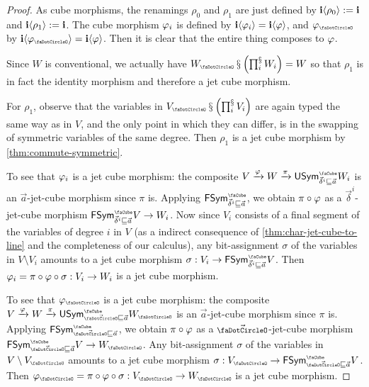\documentclass[a4paper]{memoir}
\begin{document}
\begin{proof}
	As cube morphisms, the renamings $\rho_0$ and $\rho_1$ are just defined by $\mathbf{i} \langle \rho_0 \rangle := \mathbf{i}$ and $\mathbf{i} \langle \rho_1 \rangle := \mathbf{i}$.
	The cube morphism $\varphi_i$ is defined by $\mathbf{i} \langle \varphi_i \rangle = \mathbf{i} \langle \varphi \rangle$, and $\vfi_\npolar$ by $\dm i \psub{\vfi_\npolar} = \dm i \psub{\vfi}$.
	Then it is clear that the entire thing composes to $\varphi$.
	
	Since $W$ is conventional, we actually have $W_\npolar \sss \paren{\bigsss_i W_i} = W$ so that $\rho_1$ is in fact the identity morphism and therefore a jet cube morphism.
	
	For $\rho_1$, observe that the variables in $V_\npolar \sss \paren{\bigsss_i V_i}$ are again typed the same way as in $V$, and the only point in which they can differ, is in the swapping of symmetric variables of the same degree.
	Then $\rho_1$ is a jet cube morphism by \cref{thm:commute-symmetric}.
	
	
	To see that $\varphi_i$ is a jet cube morphism: the composite $V \xrightarrow{\vfi} W \xrightarrow{\pi} \Usymcube_{\vec \delta^i \sqsubseteq \vec a} W_i$ is an $\vec a$-jet-cube morphism since $\pi$ is.
	Applying $\Fsymcube_{\vec \delta^i \sqsubseteq \vec a}$, we obtain $\pi \circ \varphi$ as a $\vec \delta^i$-jet-cube morphism $\Fsymcube_{\vec \delta^i \sqsubseteq \vec a} V \to W_i$.
	Now since $V_i$ consists of a final segment of the variables of degree $i$ in $V$ (as a indirect consequence of \cref{thm:char-jet-cube-to-line} and the completeness of our calculus), any bit-assignment $\sigma$ of the variables in $V \setminus V_i$ amounts to a jet cube morphism $\sigma : V_i \to \Fsymcube_{\vec \delta^i \sqsubseteq \vec a} V$.
	Then $\varphi_i = \pi \circ \varphi \circ \sigma : V_i \to W_i$ is a jet cube morphism.
	
	To see that $\vfi_\npolar$ is a jet cube morphism: the composite $V \xrightarrow{\vfi} W \xrightarrow{\pi} \Usymcube_{\vec \npolar \sqsubseteq \vec a} W_\npolar$ is an $\vec a$-jet-cube morphism since $\pi$ is.
	Applying $\Fsymcube_{\vec \npolar \sqsubseteq \vec a}$, we obtain $\pi \circ \varphi$ as a $\vec \npolar$-jet-cube morphism $\Fsymcube_{\vec \npolar \sqsubseteq \vec a} V \to W_\npolar$.
	Any bit-assignment $\sigma$ of the variables in $V \setminus V_\npolar$ amounts to a jet cube morphism $\sigma : V_\npolar \to \Fsymcube_{\vec \npolar \sqsubseteq \vec a} V$.
	Then $\vfi_\npolar = \pi \circ \vfi \circ \sigma : V_\npolar \to W_\npolar$ is a jet cube morphism.
\end{proof}
\end{document}
